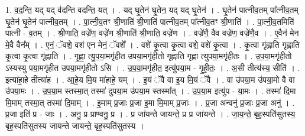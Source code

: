 \documentclass[17pt]{extarticle}
\begin{document}
1. व॒द॒न्ति॒ यद् यद् व॑दन्ति वदन्ति॒ यत् । . यद् घृ॒तेन॑ घृ॒तेन॒ यद् यद् घृ॒तेन॑ । . घृ॒तेन॑ पात्नीव॒तम् पा᳚त्नीव॒तम् घृ॒तेन॑ घृ॒तेन॑ पात्नीव॒तम् । . पा॒त्नी॒व॒तꣳ श्री॒णाति॑ श्री॒णाति॑ पात्नीव॒तम् पा᳚त्नीव॒तꣳ श्री॒णाति॑ । . पा॒त्नी॒व॒तमिति॑ पात्नी - व॒तम् । . श्री॒णाति॒ वज्रे॑ण॒ वज्रे॑ण श्री॒णाति॑ श्री॒णाति॒ वज्रे॑ण । . वज्रे॑णै॒ वैव वज्रे॑ण॒ वज्रे॑णै॒व । . ए॒वैन॑ मेन मे॒वै वैन᳚म् । . ए॒नं॒ ॅवशे॒ वश॑ एन मेनं॒ ॅवशे᳚ । . वशे॑ कृ॒त्वा कृ॒त्वा वशे॒ वशे॑ कृ॒त्वा । . कृ॒त्वा गृ॑ह्णाति गृह्णाति कृ॒त्वा कृ॒त्वा गृ॑ह्णाति । . गृ॒ह्णा॒ त्यु॒प॒या॒मगृ॑हीत उपया॒मगृ॑हीतो गृह्णाति गृह्णा त्युपया॒मगृ॑हीतः । . उ॒प॒या॒मगृ॑हीतो ऽस्यस्यु पया॒मगृ॑हीत उपया॒मगृ॑हीतो ऽसि । . उ॒प॒या॒मगृ॑हीत॒ इत्यु॑पया॒म - गृ॒ही॒तः॒ । . अ॒सी तीत्य॑स्य॒ सीति॑ । . इत्या॑हा॒हे तीत्या॑ह । . आ॒हे॒य मि॒य मा॑हाहे॒ यम् । . इ॒यं ॅवै वा इ॒य मि॒यं ॅवै । . वा उ॑पया॒म उ॑पया॒मो वै वा उ॑पया॒मः । . उ॒प॒या॒म स्तस्मा॒त् तस्मा॑ दुपया॒म उ॑पया॒म स्तस्मा᳚त् । . उ॒प॒या॒म इत्यु॑प - या॒मः । . तस्मा॑ दि॒मा मि॒माम् तस्मा॒त् तस्मा॑ दि॒माम् । . इ॒माम् प्र॒जाः प्र॒जा इ॒मा मि॒माम् प्र॒जाः । . प्र॒जा अन्वनु॑ प्र॒जाः प्र॒जा अनु॑ । . प्र॒जा इति॑ प्र - जाः । . अनु॒ प्र प्राण्वनु॒ प्र । . प्र जा॑यन्ते जायन्ते॒ प्र प्र जा॑यन्ते । . जा॒य॒न्ते॒ बृह॒स्पति॑सुतस्य॒ बृह॒स्पति॑सुतस्य जायन्ते जायन्ते॒ बृह॒स्पति॑सुतस्य । \newline
\end{document}
